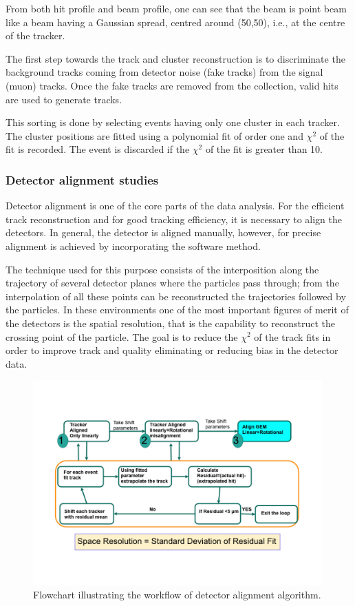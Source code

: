 From both hit profile and beam profile, one can see that the beam is point beam like a beam having a Gaussian spread, centred around (50,50), i.e., at the centre of the tracker.

The first step towards the track and cluster reconstruction is to discriminate the background tracks coming from detector noise (fake tracks) from the signal (muon) tracks. Once the fake tracks are removed from the collection, valid hits are used to generate tracks.

This sorting is done by selecting events having only one cluster in each tracker. The cluster positions are fitted using a polynomial fit of order one and $\chi^2$ of the fit is recorded.
The event is discarded if the $\chi^2$ of the fit is greater than 10.

\subsubsection{Detector alignment studies}
Detector alignment is one of the core parts of the data analysis. 
For the efficient track reconstruction and for good tracking efficiency, it is necessary to align the detectors.
In general, the detector is aligned manually, however, for precise alignment is achieved by incorporating the software method.

The technique used for this purpose consists of the interposition along the trajectory of several detector planes where the particles pass through; from the interpolation of all these points can be reconstructed the trajectories followed by the particles.
In these environments one of the most important figures of merit of the detectors is the spatial resolution, that is the capability to reconstruct the crossing point of the particle.
The goal is to reduce the $\chi^{2}$ of the track fits in order to improve track and quality eliminating or reducing bias in the detector data.
\begin{figure}[htbp]
    \centering
    \includegraphics[width=0.99\textwidth]{figures/GEM/GEM_Alignment_FlowChart.pdf}
    \caption{Flowchart illustrating the workflow of detector alignment algorithm.}
    \label{fig:alignment}
\end{figure}

